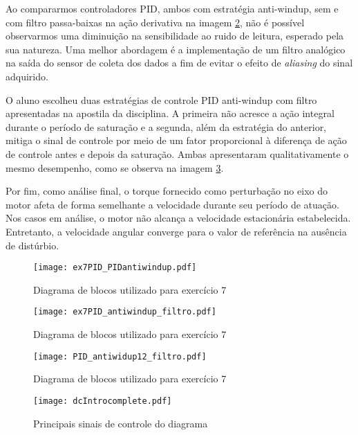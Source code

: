 Ao compararmos controladores PID, ambos com estratégia anti-windup, sem e com filtro passa-baixas na ação derivativa na imagem \ref{fig:PIDfiltro}, não é possível observarmos uma diminuição na sensibilidade ao ruido de leitura, esperado pela sua natureza. Uma melhor abordagem é a implementação de um filtro analógico na saída do sensor de coleta dos dados a fim de evitar o efeito de \emph{aliasing} do sinal adquirido.

O aluno escolheu duas estratégias de controle PID anti-windup com filtro apresentadas na apostila da disciplina. A primeira não acresce a ação integral durante o período de saturação e a segunda, além da estratégia do anterior, mitiga o sinal de controle por meio de um fator proporcional à diferença de ação de controle antes e depois da saturação. Ambas apresentaram qualitativamente o mesmo desempenho, como se observa na imagem \ref{fig:PIDantiwindup12}.

Por fim, como análise final, o torque fornecido como perturbação no eixo do motor afeta de forma semelhante a velocidade durante seu período de atuação. Nos casos em análise, o motor não alcança a velocidade estacionária estabelecida. Entretanto, a velocidade angular converge para o valor de referência na ausência de distúrbio.

\begin{figure}[H]
    \center
    \texttt{[image: ex7PID\_PIDantiwindup.pdf]}
    \caption{Diagrama de blocos utilizado para exercício 7}
    \label{fig:PIDantiwindup}
\end{figure}

\begin{figure}[H]
    \center
    \texttt{[image: ex7PID\_antiwindup\_filtro.pdf]}
    \caption{Diagrama de blocos utilizado para exercício 7}
    \label{fig:PIDfiltro}
\end{figure}

\begin{figure}[H]
    \center
    \texttt{[image: PID\_antiwidup12\_filtro.pdf]}
    \caption{Diagrama de blocos utilizado para exercício 7}
    \label{fig:PIDantiwindup12}
\end{figure}

\begin{figure}[H]
    \center
    \texttt{[image: dcIntrocomplete.pdf]}
    \caption{Principais sinais de controle do diagrama} 
    \label{fig:dcIntrocomplete}
\end{figure}